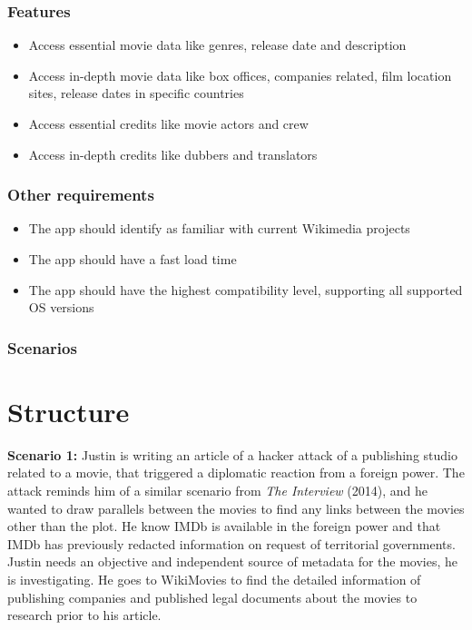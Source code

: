 \documentclass[11pt]{article}
\begin{document}
\subsubsection{Features}

\begin{itemize}
  \item Access essential movie data like genres, release date and description
  \item Access in-depth movie data like box offices, companies related, film location sites, release dates in specific countries
  \item Access essential credits like movie actors and crew
  \item Access in-depth credits like dubbers and translators
\end{itemize}


\subsubsection{Other requirements}

\begin{itemize}
  \item The app should identify as familiar with current Wikimedia projects
  \item The app should have a fast load time
  \item The app should have the highest compatibility level, supporting all supported OS versions
\end{itemize}


\subsubsection{Scenarios}

\section{Structure}

\textbf{Scenario 1:} Justin is writing an article of a hacker attack of a publishing studio related to a movie, that triggered a diplomatic reaction from a foreign power. The attack reminds him of a similar scenario from \textit{The Interview} (2014), and he wanted to draw parallels between the movies to find any links between the movies other than the plot. He know IMDb is available in the foreign power and that IMDb has previously redacted information on request of territorial governments. Justin needs an objective and independent source of metadata for the movies, he is investigating. He goes to WikiMovies to find the detailed information of publishing companies and published legal documents about the movies to research prior to his article.
\end{document}

